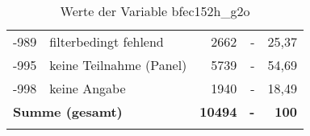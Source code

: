 \begin{longtable}{Xlrrr}
       -989 & filterbedingt fehlend & 2662 & - & 25,37 \\

       -995 & keine Teilnahme (Panel) & 5739 & - & 54,69 \\

       -998 & keine Angabe & 1940 & - & 18,49 \\

     \midrule
     \multicolumn{2}{l}{\textbf{Summe (gesamt)}} & \textbf{10494} & \textbf{-} & \textbf{100} \\
     \bottomrule
     \caption{Werte der Variable bfec152h\_g2o}
     \end{longtable}
     
